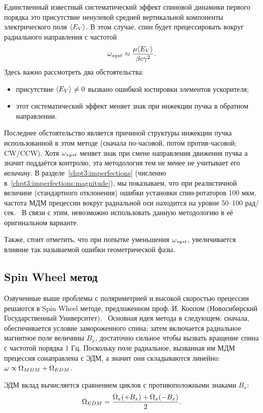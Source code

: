 Единственный известный систематический эффект спиновой динамики
первого порядка это присутствие ненулевой средней вертикальной
компоненты электрического поля $\avg{E_V}$. В этом случае, спин будет
прецессировать вокруг радиального направления с частотой~\cite[стр.~11]{BNL:Deuteron2008}
\[
\w_{syst} \approx \frac{\mu\avg{E_V}}{\beta c\gamma^2}.
\]
Здесь важно рассмотреть два обстоятельства:
\begin{itemize}
\item присутствие $\avg{E_V}\neq 0$ вызвано ошибкой юстировки
  элементов ускорителя;
\item этот систематический эффект меняет знак при инжекции пучка в
  обратном направлении.
\end{itemize}
Последнее обстоятельство является причиной структуры инжекции пучка
использованной в этом методе (сначала по-часовой, потом
против-часовой; CW/CCW). Хотя $\omega_{syst}$ меняет знак при смене
направления движения пучка а значит поддаётся контролю, эта методология тем не менее не учитывает
его \emph{величину}. В разделе~\ref{chpt3:imperfections} (численно в~\ref{chpt3:imperfections:magnitude}), 
мы показываем, что при реалистичной величине (стандартного отклонения) ошибки установки
спин-ротаторов 100 мкм, частота МДМ прецессии вокруг радиальной оси
находится на уровне 50--100 рад/сек.~\cite{Senichev:FDM} В связи с
этим, невозможно использовать данную методологию в её оригинальном варианте.

Также, стоит отметить, что при попытке уменьшения $\omega_{syst}$, увеличивается влияние
так называемой ошибки геометрической фазы.~\cite[стр.~6]{BNL:Proton}

\subsection{Spin Wheel метод}
Озвученные выше проблемы с поляриметрией и высокой скоростью прецессии
решаются в Spin Wheel методе, предложенном проф. И. Коопом
(Новосибирский Государственный Университет).~\cite{Koop:SpinWheel} Основная идея метода в
следующем: сначала, обеспечивается условие замороженного спина; затем
включается радиальное магнитное поле величины $B_x$, достаточно сильное чтобы
вызвать вращение спина с частотой порядка 1 Гц. Поскольку поле
радиальное, вызванная им МДМ прецессия сонаправлена с ЭДМ, а значит
они складываются линейно: $\omega \propto \Omega_{MDM} + \Omega_{EDM}$.

ЭДМ вклад вычисляется сравнением циклов с противоположными знаками $B_x$:~\cite[стр.~1963]{Koop:SpinWheel}
\[
\Omega_{EDM} = \frac{\Omega_x(+B_x) + \Omega_x(-B_x)}{2}.
\]

